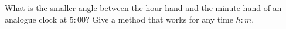 What is the smaller angle between the hour hand and the minute hand of an analogue clock at $5{:}00$? Give a method that works for any time $h{:}m$.

